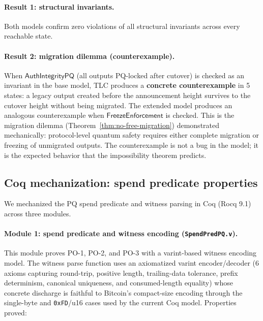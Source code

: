 \documentclass[11pt]{article}
\begin{document}
\paragraph{Result 1: structural invariants.}
Both models confirm zero violations of all structural invariants across every reachable state.

\paragraph{Result 2: migration dilemma (counterexample).}
When $\textsf{AuthIntegrityPQ}$ (all outputs PQ-locked after cutover) is checked as an invariant in the base model, TLC produces a \textbf{concrete counterexample} in 5 states: a legacy output created before the announcement height survives to the cutover height without being migrated.
The extended model produces an analogous counterexample when $\textsf{FreezeEnforcement}$ is checked.
This is the migration dilemma (Theorem~\ref{thm:no-free-migration}) demonstrated mechanically: protocol-level quantum safety requires either complete migration or freezing of unmigrated outputs.
The counterexample is not a bug in the model; it is the expected behavior that the impossibility theorem predicts.

\subsection{Coq mechanization: spend predicate properties}\label{sec:coq-results}

We mechanized the PQ spend predicate and witness parsing in Coq (Rocq 9.1) across three modules.

\paragraph{Module 1: spend predicate and witness encoding (\texttt{SpendPredPQ.v}).}
This module proves PO-1, PO-2, and PO-3 with a varint-based witness encoding model.
The witness parse function uses an axiomatized varint encoder/decoder (6 axioms capturing round-trip, positive length, trailing-data tolerance, prefix determinism, canonical uniqueness, and consumed-length equality) whose concrete discharge is faithful to Bitcoin's compact-size encoding through the single-byte and \texttt{0xFD}/u16 cases used by the current Coq model.
Properties proved:
\end{document}
